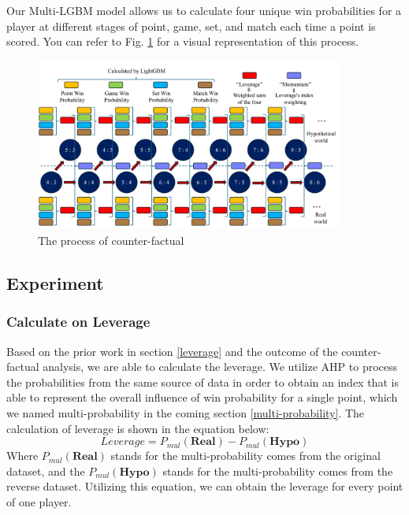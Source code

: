 \documentclass{mcmthesis}
\begin{document}
Our Multi-LGBM model allows us to calculate four unique win probabilities for a player at different stages of point, game, set, and match each time a point is scored. You can refer to Fig. \ref{fig:momentum} for a visual representation of this process. 

\begin{figure}[ht]
    \centering
    \begin{minipage}{\textwidth}
        \centering
        \includegraphics[width=0.9\textwidth]{figures/momentum.pdf} 
        \caption{The process of counter-factual}
        \label{fig:momentum}
    \end{minipage}\hfill
\end{figure}

\subsection{Experiment}
\subsubsection{Calculate on Leverage}
Based on the prior work in section \ref{leverage} and the outcome of the counter-factual analysis, we are able to calculate the leverage. We utilize AHP to process the probabilities from the same source of data in order to obtain an index that is able to represent the overall influence of win probability for a single point, which we named multi-probability in the coming section \ref{multi-probability}.
The calculation of leverage is shown in the equation below:
\begin{equation} \label{eq:leverage}
Leverage = P_\textit{mul}( \textbf{Real}) - P_\textit{mul}( \textbf{Hypo})
\end{equation}
Where $P_\textit{mul}( \textbf{Real})$ stands for the multi-probability comes from the original dataset, and the $P_\textit{mul}( \textbf{Hypo})$ stands for the multi-probability comes from the reverse dataset. Utilizing this equation, we can obtain the leverage for every point of one player.
\end{document}
